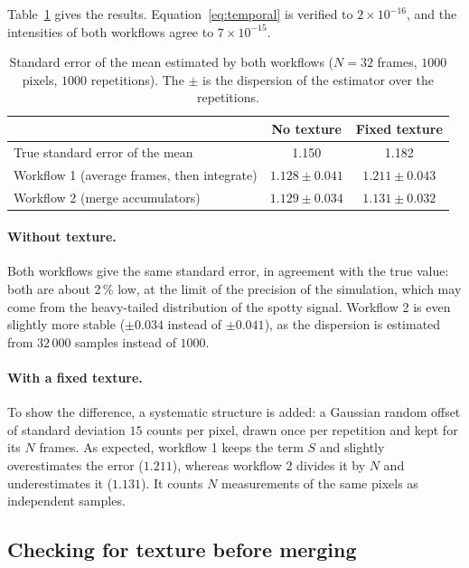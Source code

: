 \documentclass[a4paper,11pt]{article}
\begin{document}
Table~\ref{tab:simulation} gives the results. Equation~\eqref{eq:temporal} is verified to $2\times10^{-16}$,
and the intensities of both workflows agree to $7\times10^{-15}$.

\begin{table}[ht]
\centering
\small
\begin{tabular}{lcc}
\toprule
 & No texture & Fixed texture \\
\midrule
True standard error of the mean & 1.150 & 1.182 \\
Workflow 1 (average frames, then integrate) & $1.128 \pm 0.041$ & $1.211 \pm 0.043$ \\
Workflow 2 (merge accumulators) & $1.129 \pm 0.034$ & $1.131 \pm 0.032$ \\
\bottomrule
\end{tabular}
\caption{Standard error of the mean estimated by both workflows ($N=32$ frames, $1000$ pixels, $1000$
repetitions). The $\pm$ is the dispersion of the estimator over the repetitions.}
\label{tab:simulation}
\end{table}

\paragraph{Without texture.} Both workflows give the same standard error, in agreement with the true
value: both are about 2\,\% low, at the limit of the precision of the simulation, which may come from
the heavy-tailed distribution of the spotty signal. Workflow 2 is even slightly more stable
($\pm0.034$ instead of $\pm0.041$), as the dispersion is estimated from $32\,000$ samples instead of $1000$.

\paragraph{With a fixed texture.} To show the difference, a systematic structure is added: a Gaussian
random offset of standard deviation $15$ counts per pixel, drawn once per repetition and kept for its
$N$ frames. As expected, workflow 1 keeps the term $S$ and slightly overestimates the error ($1.211$),
whereas workflow 2 divides it by $N$ and underestimates it ($1.131$). It counts $N$ measurements of the
same pixels as independent samples.

\subsection{Checking for texture before merging}
\end{document}
